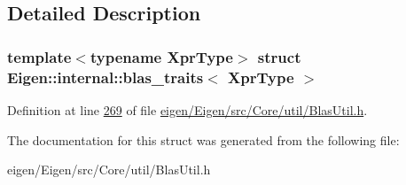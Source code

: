 \subsection{Detailed Description}
\subsubsection*{template$<$typename Xpr\+Type$>$\newline
struct Eigen\+::internal\+::blas\+\_\+traits$<$ Xpr\+Type $>$}



Definition at line \hyperlink{eigen_2_eigen_2src_2_core_2util_2_blas_util_8h_source_l00269}{269} of file \hyperlink{eigen_2_eigen_2src_2_core_2util_2_blas_util_8h_source}{eigen/\+Eigen/src/\+Core/util/\+Blas\+Util.\+h}.



The documentation for this struct was generated from the following file\+:\begin{DoxyCompactItemize}
\item 
eigen/\+Eigen/src/\+Core/util/\+Blas\+Util.\+h\end{DoxyCompactItemize}
